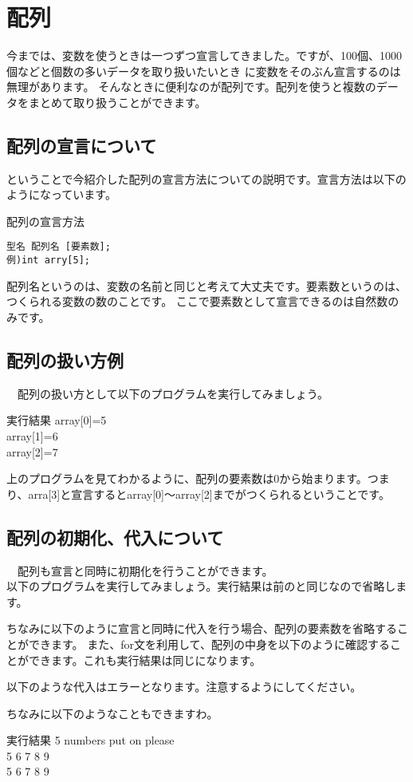 ﻿\section{配列}
 今までは、変数を使うときは一つずつ宣言してきました。ですが、100個、1000個などと個数の多いデータを取り扱いたいとき
に変数をそのぶん宣言するのは無理があります。
そんなときに便利なのが配列です。配列を使うと複数のデータをまとめて取り扱うことができます。
\subsection{配列の宣言について}
ということで今紹介した配列の宣言方法についての説明です。宣言方法は以下のようになっています。
\begin{itembox}{配列の宣言方法}
\begin{verbatim}
型名 配列名 [要素数];
例)int arry[5];
\end{verbatim}
\end{itembox}
配列名というのは、変数の名前と同じと考えて大丈夫です。要素数というのは、つくられる変数の数のことです。
ここで要素数として宣言できるのは自然数のみです。
\subsection{配列の扱い方例}
　配列の扱い方として以下のプログラムを実行してみましょう。

\begin{itembox}{実行結果}
array[0]=5\\
array[1]=6\\
array[2]=7
\end{itembox}
上のプログラムを見てわかるように、配列の要素数は0から始まります。つまり、arra[3]と宣言するとarray[0]～array[2]までがつくられるということです。

\subsection{配列の初期化、代入について}
　配列も宣言と同時に初期化を行うことができます。\\
以下のプログラムを実行してみましょう。実行結果は前のと同じなので省略します。


ちなみに以下のように宣言と同時に代入を行う場合、配列の要素数を省略することができます。
また、for文を利用して、配列の中身を以下のように確認することができます。これも実行結果は同じになります。


以下のような代入はエラーとなります。注意するようにしてください。


ちなみに以下のようなこともできますわ。

\begin{itembox}{実行結果}
5 numbers put on please\\
5 6 7 8 9\\
5 6 7 8 9
\end{itembox}
